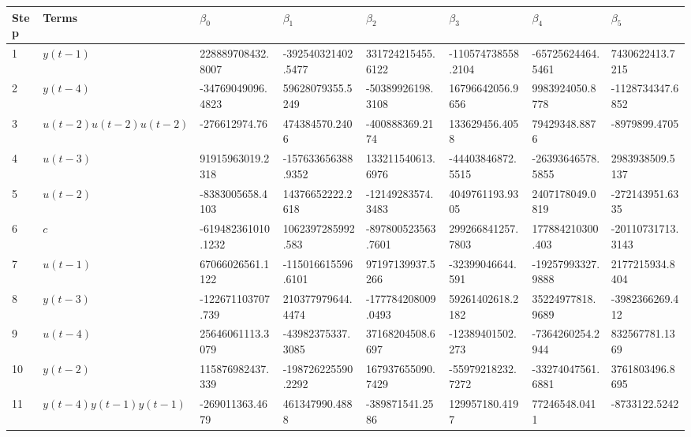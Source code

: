 \begin{tabular}{llllllll}
Step & Terms & $\beta_{0}$ & $\beta_{1}$ & $\beta_{2}$ & $\beta_{3}$ & $\beta_{4}$ & $\beta_{5}$ \\ 
\hline 
1 & $y(t-1)$ & 228889708432.8007 & -392540321402.5477 & 331724215455.6122 & -110574738558.2104 & -65725624464.5461 & 7430622413.7215 \\ 
2 & $y(t-4)$ & -34769049096.4823 & 59628079355.5249 & -50389926198.3108 & 16796642056.9656 & 9983924050.8778 & -1128734347.6852 \\ 
3 & $u(t-2)u(t-2)u(t-2)$ & -276612974.76 & 474384570.2406 & -400888369.2174 & 133629456.4058 & 79429348.8876 & -8979899.4705 \\ 
4 & $u(t-3)$ & 91915963019.2318 & -157633656388.9352 & 133211540613.6976 & -44403846872.5515 & -26393646578.5855 & 2983938509.5137 \\ 
5 & $u(t-2)$ & -8383005658.4103 & 14376652222.2618 & -12149283574.3483 & 4049761193.9305 & 2407178049.0819 & -272143951.6335 \\ 
6 & $c$ & -619482361010.1232 & 1062397285992.583 & -897800523563.7601 & 299266841257.7803 & 177884210300.403 & -20110731713.3143 \\ 
7 & $u(t-1)$ & 67066026561.1122 & -115016615596.6101 & 97197139937.5266 & -32399046644.591 & -19257993327.9888 & 2177215934.8404 \\ 
8 & $y(t-3)$ & -122671103707.739 & 210377979644.4474 & -177784208009.0493 & 59261402618.2182 & 35224977818.9689 & -3982366269.412 \\ 
9 & $u(t-4)$ & 25646061113.3079 & -43982375337.3085 & 37168204508.6697 & -12389401502.273 & -7364260254.2944 & 832567781.1369 \\ 
10 & $y(t-2)$ & 115876982437.339 & -198726225590.2292 & 167937655090.7429 & -55979218232.7272 & -33274047561.6881 & 3761803496.8695 \\ 
11 & $y(t-4)y(t-1)y(t-1)$ & -269011363.4679 & 461347990.4888 & -389871541.2586 & 129957180.4197 & 77246548.0411 & -8733122.5242 \\ 
\hline 
\end{tabular}
